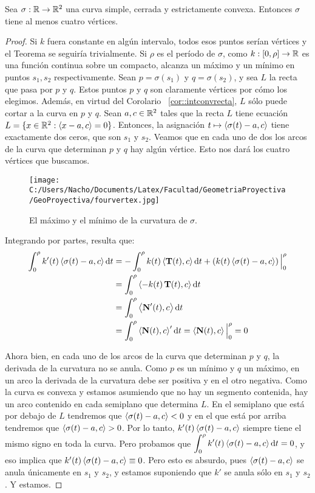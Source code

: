 \begin{teo}
Sea $\sigma:\mathbb{R}\to\mathbb{R}^2$ una curva simple, cerrada y estrictamente convexa. Entonces $\sigma$ tiene al menos cuatro vértices.
\begin{proof}
Si $k$ fuera constante en algún intervalo, todos esos puntos serían vértices y el Teorema se seguiría trivialmente. Si $\rho$ es el período de $\sigma$, como $k:[0,\rho]\to\mathbb{R}$ es una función continua sobre un compacto, alcanza un máximo y un mínimo en puntos $s_1,s_2$ respectivamente. Sean $p=\sigma(s_1)$ y $q=\sigma(s_2)$, y sea $L$ la recta que pasa por $p$ y $q$. Estos puntos $p$ y $q$ son claramente vértices por cómo los elegimos. Además, en virtud del Corolario ~\ref{cor::intconvrecta}, $L$ sólo puede cortar a la curva en $p$ y $q$. Sean $a,c\in\mathbb{R}^2$ tales que la recta $L$ tiene ecuación $L=\{x\in\mathbb{R}^2 : \left\langle x-a,c \right\rangle=0\}$. Entonces, la asignación $t\mapsto\left\langle \sigma(t)-a,c \right\rangle$ tiene exactamente dos ceros, que son $s_1$ y $s_2$. Veamos que en cada uno de dos los arcos de la curva que determinan $p$ y $q$ hay algún vértice. Esto nos dará los cuatro vértices que buscamos.

\begin{figure}[h]
	\centering
		\texttt{[image: C:/Users/Nacho/Documents/Latex/Facultad/GeometriaProyectiva/GeoProyectiva/fourvertex.jpg]}
	\caption{El máximo y el mínimo de la curvatura de $\sigma$.}
	\label{fig:fourvertex}
\end{figure}

Integrando por partes, resulta que: \begin{align*}\int_{0}^{\rho} k'(t)\left\langle \sigma(t)-a,c \right\rangle\mathop{}\!\mathrm{d} t &= -\int_{0}^{\rho}k(t)\left\langle \operatorname{\mathbf{T}}(t),c \right\rangle\mathop{}\!\mathrm{d} t + \left(k(t)\left\langle \sigma(t)-a,c \right\rangle\right)\Big\rvert_{0}^{\rho}\\ &= \int_{0}^{\rho} \left\langle -k(t)\operatorname{\mathbf{T}}(t),c \right\rangle\mathop{}\!\mathrm{d} t\\ &= \int_{0}^{\rho}\left\langle \operatorname{\mathbf{N}}'(t),c \right\rangle\mathop{}\!\mathrm{d} t\\ &=\int_{0}^{\rho}\left\langle \operatorname{\mathbf{N}}(t),c \right\rangle'\mathop{}\!\mathrm{d} t = \left\langle \operatorname{\mathbf{N}}(t),c \right\rangle\Big\rvert_{0}^{\rho} = 0 \end{align*}

Ahora bien, en cada uno de los arcos de la curva que determinan $p$ y $q$, la derivada de la curvatura no se anula. Como $p$ es un mínimo y $q$ un máximo, en un arco la derivada de la curvatura debe ser positiva y en el otro negativa. Como la curva es convexa y estamos asumiendo que no hay un segmento contenida, hay un arco contenido en cada semiplano que determina $L$. En el semiplano que está por debajo de $L$ tendremos que $\left\langle \sigma(t)-a,c \right\rangle<0$ y en el que está por arriba tendremos que $\left\langle \sigma(t)-a,c \right\rangle>0$. Por lo tanto, $k'(t)\left\langle \sigma(t)-a,c \right\rangle$ siempre tiene el mismo signo en toda la curva. Pero probamos que $\displaystyle\int_{0}^{\rho}k'(t)\left\langle \sigma(t)-a,c \right\rangle\mathop{}\!\mathrm{d} t=0$, y eso implica que $k'(t)\left\langle \sigma(t)-a,c \right\rangle\equiv 0$. Pero esto es absurdo, pues $\left\langle \sigma(t)-a,c \right\rangle$ se anula únicamente en $s_1$ y $s_2$, y estamos suponiendo que $k'$ se anula sólo en $s_1$ y $s_2$. Y estamos.
\end{proof}
\end{teo}
